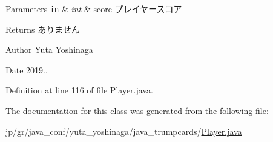 \begin{DoxyParams}[1]{Parameters}
\mbox{\tt in}  & {\em int} & score プレイヤースコア \\
\hline
\end{DoxyParams}
\begin{DoxyReturn}{Returns}
ありません 
\end{DoxyReturn}
\begin{DoxyAuthor}{Author}
Yuta Yoshinaga 
\end{DoxyAuthor}
\begin{DoxyDate}{Date}
2019.. 
\end{DoxyDate}


Definition at line 116 of file Player.\+java.



The documentation for this class was generated from the following file\+:\begin{DoxyCompactItemize}
\item 
jp/gr/java\+\_\+conf/yuta\+\_\+yoshinaga/java\+\_\+trumpcards/\hyperlink{_player_8java}{Player.\+java}\end{DoxyCompactItemize}
